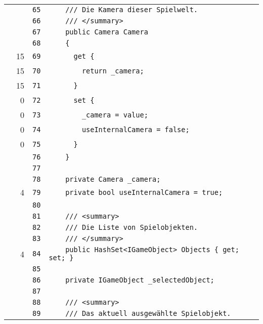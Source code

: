 \documentclass[a4paper,10pt]{article}
\begin{document}
\begin{longtable}[l]{lrrl}
\cellcolor{gray} &  & \verb~65~ & \verb~    /// Die Kamera dieser Spielwelt.~\\
\cellcolor{gray} &  & \verb~66~ & \verb~    /// </summary>~\\
\cellcolor{gray} &  & \verb~67~ & \verb~    public Camera Camera~\\
\cellcolor{gray} &  & \verb~68~ & \verb~    {~\\
\cellcolor{green} & 15 & \verb~69~ & \verb~      get {~\\
\cellcolor{green} & 15 & \verb~70~ & \verb~        return _camera;~\\
\cellcolor{green} & 15 & \verb~71~ & \verb~      }~\\
\cellcolor{red} & 0 & \verb~72~ & \verb~      set {~\\
\cellcolor{red} & 0 & \verb~73~ & \verb~        _camera = value;~\\
\cellcolor{red} & 0 & \verb~74~ & \verb~        useInternalCamera = false;~\\
\cellcolor{red} & 0 & \verb~75~ & \verb~      }~\\
\cellcolor{gray} &  & \verb~76~ & \verb~    }~\\
\cellcolor{gray} &  & \verb~77~ & \verb~~\\
\cellcolor{gray} &  & \verb~78~ & \verb~    private Camera _camera;~\\
\cellcolor{green} & 4 & \verb~79~ & \verb~    private bool useInternalCamera = true;~\\
\cellcolor{gray} &  & \verb~80~ & \verb~~\\
\cellcolor{gray} &  & \verb~81~ & \verb~    /// <summary>~\\
\cellcolor{gray} &  & \verb~82~ & \verb~    /// Die Liste von Spielobjekten.~\\
\cellcolor{gray} &  & \verb~83~ & \verb~    /// </summary>~\\
\cellcolor{green} & 4 & \verb~84~ & \verb~    public HashSet<IGameObject> Objects { get; set; }~\\
\cellcolor{gray} &  & \verb~85~ & \verb~~\\
\cellcolor{gray} &  & \verb~86~ & \verb~    private IGameObject _selectedObject;~\\
\cellcolor{gray} &  & \verb~87~ & \verb~~\\
\cellcolor{gray} &  & \verb~88~ & \verb~    /// <summary>~\\
\cellcolor{gray} &  & \verb~89~ & \verb~    /// Das aktuell ausgewählte Spielobjekt.~\\

\end{longtable}
\end{document}

